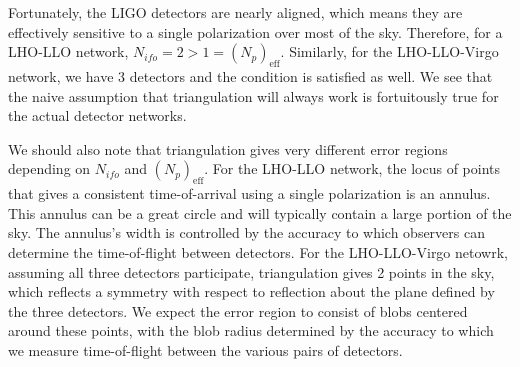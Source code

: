 \documentclass[10pt]{article}
\begin{document}
Fortunately, the LIGO detectors are nearly aligned, which means they are effectively sensitive to a single polarization over most of the sky. Therefore, for a LHO-LLO network, $N_{ifo}=2 > 1=\left(N_p\right)_{\mathrm{eff}}$. Similarly, for the LHO-LLO-Virgo network, we have 3 detectors and the condition is satisfied as well. We see that the naive assumption that triangulation will always work is fortuitously true for the actual detector networks.

We should also note that triangulation gives very different error regions depending on $N_{ifo}$ and $\left(N_{p}\right)_{\mathrm{eff}}$. For the LHO-LLO network, the locus of points that gives a consistent time-of-arrival using a single polarization is an annulus. This annulus can be a great circle and will typically contain a large portion of the sky. The annulus's width is controlled by the accuracy to which observers can determine the time-of-flight between detectors. For the LHO-LLO-Virgo netowrk, assuming all three detectors participate, triangulation gives 2 points in the sky, which reflects a symmetry with respect to reflection about the plane defined by the three detectors. We expect the error region to consist of blobs centered around these points, with the blob radius determined by the accuracy to which we measure time-of-flight between the various pairs of detectors.
\end{document}
